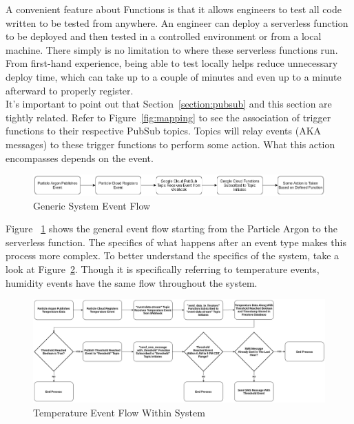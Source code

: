 \documentclass{article}
\begin{document}
A convenient feature about Functions is that it allows engineers to test all code written to be tested from anywhere. An engineer can deploy a serverless function to be deployed and then tested in a controlled environment or from a local machine. There simply is no limitation to where these serverless functions run. From first-hand experience, being able to test locally helps reduce unnecessary deploy time, which can take up to a couple of minutes and even up to a minute afterward to properly register.\\

It's important to point out that Section~\ref{section:pubsub} and this section are tightly related. Refer to Figure~\ref{fig:mapping} to see the association of trigger functions to their respective PubSub topics. Topics will relay events (AKA messages) to these trigger functions to perform some action. What this action encompasses depends on the event.\\

\begin{figure}[H]
    \center
    \includegraphics[width=\textwidth]{images/generic-temperature-humidity-flow.png}
    \caption{Generic System Event Flow}
    \label{fig:event-flow}
\end{figure}

Figure ~\ref{fig:event-flow} shows the general event flow starting from the Particle Argon to the serverless function. The specifics of what happens after an event type makes this process more complex. To better understand the specifics of the system, take a look at Figure~\ref{fig:climate-event-flow}. Though it is specifically referring to temperature events, humidity events have the same flow throughout the system.

\begin{figure}[H]
    \center
    \includegraphics[width=\textwidth]{images/climate-event-flow.png}
    \caption{Temperature Event Flow Within System}
    \label{fig:climate-event-flow}
\end{figure}
\end{document}
